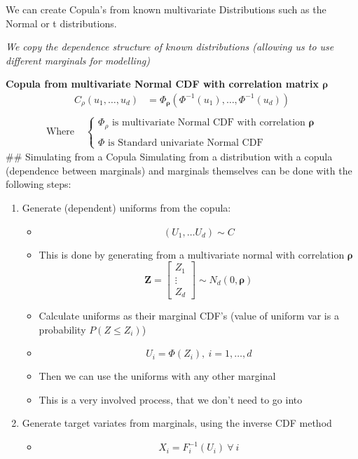 \documentclass[
  oneside]{book}
\providecommand{\tightlist}{%
  \setlength{\itemsep}{0pt}\setlength{\parskip}{0pt}}
\begin{document}
We can create Copula's from known multivariate Distributions such as the Normal or t distributions.

\emph{We copy the dependence structure of known distributions (allowing us to use different marginals for modelling)}

\textbf{Copula from multivariate Normal CDF with correlation matrix \(\boldsymbol{\rho}\)}
\[
\begin{aligned}
C_{\rho}(u_{1},\dots ,u_{d}) &= \Phi_{\boldsymbol{\rho}}(\Phi ^{-1}(u_{1}), \dots, \Phi ^{-1}(u_{d}))\\
\end{aligned}
\]
\[
\begin{aligned}
\text{Where } & \begin{cases}
\Phi_{\rho} \text{ is multivariate Normal CDF with correlation } \boldsymbol{\rho} \\ \\
\Phi \text{ is Standard univariate Normal CDF}
\end{cases}
\end{aligned}
\]
\#\# Simulating from a Copula
Simulating from a distribution with a copula (dependence between marginals) and marginals themselves can be done with the following steps:

\begin{enumerate}
\def\labelenumi{\arabic{enumi}.}
\tightlist
\item
  Generate (dependent) uniforms from the copula:

  \begin{itemize}
  \tightlist
  \item
    \[
    (U_{1},\dots U_{d}) \sim C
    \]
  \item
    This is done by generating from a multivariate normal with correlation \(\boldsymbol{\rho}\)
    \[
    \mathbf{Z} = \left[ \begin{array}{l}
    Z_{1} \\
    \vdots \\
    Z_{d}
    \end{array} \right] \sim N_{d}(0,\boldsymbol{\rho})
    \]
  \item
    Calculate uniforms as their marginal CDF's (value of uniform var is a probability \(P(Z \leq Z_{i})\))
  \item
    \[
    U_{i}=\Phi(Z_{i}), \ i=1,\dots,d
    \]
  \item
    Then we can use the uniforms with any other marginal
  \item
    This is a very involved process, that we don't need to go into
  \end{itemize}
\item
  Generate target variates from marginals, using the inverse CDF method

  \begin{itemize}
  \tightlist
  \item
    \[
    X_{i} = F_{i}^{-1}(U_{i}) \ \forall \ i
    \]
  \end{itemize}
\end{enumerate}
\end{document}
